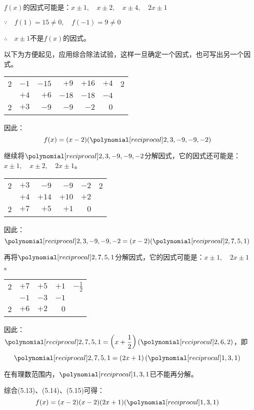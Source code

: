 \begin{solution}
$f(x)$的因式可能是：$x\pm 1,\quad x\pm 2,\quad x\pm 4,\quad 2x\pm 1$

$\because\quad f(1)=15\ne 0,\quad f(-1)=9\ne 0$

$\therefore\quad x\pm 1$不是$f(x)$的因式。

以下为方便起见，应用综合除法试验，这样一旦确定一个因式，也可写出另一个因式。
\begin{center}
    \begin{tabular}{rrrrrr|r}
       2   &  $-1$ &  $-15$  &  $+9$ & $+16$& $+4$  & 2\\
        \cline{7-7}
        & $+4$ & $+6$& $-18$& $-18$& $-4$\\
        \cline{1-6}
        2& $+3$ &$-9$ &$-9$&$-2$&  $\boxed{0}$\\
    \end{tabular}    
    \end{center}
因此：
\begin{equation}
    f(x)=(x-2)(\poly{2,3,-9,-9,-2})
\end{equation}

继续将$\poly{2,3,-9,-9,-2}$分解因式，它的因式还可能是：$x\pm 1,\quad x\pm 2,\quad 2x\pm 1$。
\begin{center}
    \begin{tabular}{rrrrr|r}
       2   &  $+3$ &  $-9$  &  $-9$ & $-2$  & 2\\
        \cline{6-6}
        & $+4$ & $+14$& $+10$& $+2$\\
        \cline{1-5}
        2& $+7$ &$+5$ &$+1$&  $\boxed{0}$\\
    \end{tabular}    
    \end{center}
    因此：
\begin{equation}
    \poly{2,3,-9,-9,-2}=(x-2)(\poly{2,7,5,1})  
\end{equation}

再将$\poly{2,7,5,1}$分解因式，它的因式可能是：$x\pm 1,\quad 2x\pm 1$。
\begin{center}
    \begin{tabular}{rrrr|r}
       2   &  $+7$ &  $+5$  &  $+1$  & $-\frac{1}{2}$\\
        \cline{5-5}
        & $-1$ & $-3$& $-1$\\
        \cline{1-4}
        2& $+6$ &$+2$&  $\boxed{0}$\\
    \end{tabular}    
    \end{center}
    因此：$\poly{2,7,5,1}=\left(x+\frac{1}{2}\right)(\poly{2,6,2})$，即
\begin{equation}
    \poly{2,7,5,1}=\left(2x+1\right)(\poly{1,3,1})
\end{equation}

在有理数范围内，$\poly{1,3,1}$已不能再分解。

综合(5.13)、(5.14)、(5.15)可得：
\[f(x)=(x-2)(x-2)(2x+1)(\poly{1,3,1})\]

\end{solution}

